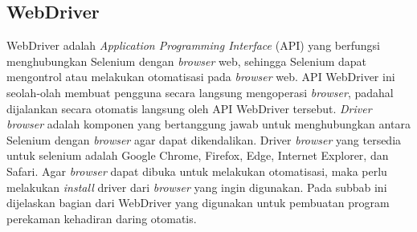 \subsection{WebDriver}
\label{sec:webdriver}
WebDriver adalah \textit{Application Programming Interface} (API) yang berfungsi menghubungkan Selenium dengan \textit{browser} web, sehingga Selenium dapat mengontrol atau melakukan otomatisasi pada \textit{browser} web\cite{selenium}. API WebDriver ini seolah-olah membuat pengguna secara langsung mengoperasi \textit{browser}, padahal dijalankan secara otomatis langsung oleh API WebDriver tersebut. 
\textit{Driver} \textit{browser} adalah komponen yang bertanggung jawab untuk menghubungkan antara Selenium dengan \textit{browser} agar dapat dikendalikan. Driver \textit{browser} yang tersedia untuk selenium adalah Google Chrome, Firefox, Edge, Internet Explorer, dan Safari. Agar \textit{browser} dapat dibuka untuk melakukan otomatisasi, maka perlu melakukan \textit{install} driver dari \textit{browser} yang ingin digunakan. Pada subbab ini dijelaskan bagian dari WebDriver yang digunakan untuk pembuatan program perekaman kehadiran daring otomatis.

